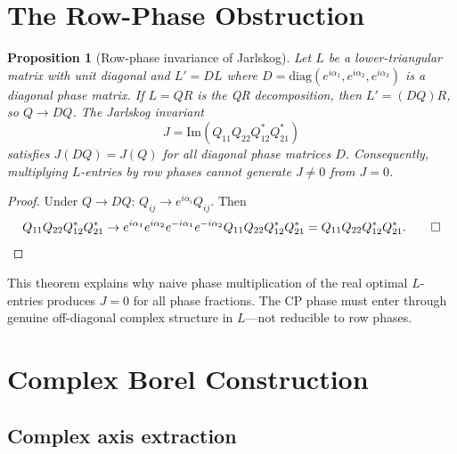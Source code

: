 \documentclass[11pt,a4paper]{article}
\newtheorem{proposition}{Proposition}
\begin{document}
\section{The Row-Phase Obstruction}
\label{sec:obstruction}

\begin{proposition}[Row-phase invariance of Jarlskog]
\label{prop:rowphase}
Let $L$ be a lower-triangular matrix with unit diagonal and
$L' = DL$ where $D = \mathrm{diag}(e^{i\alpha_1}, e^{i\alpha_2},
e^{i\alpha_3})$ is a diagonal phase matrix.  If $L = QR$ is the QR
decomposition, then $L' = (DQ)R$, so $Q \to DQ$.  The Jarlskog
invariant
\begin{equation}
  J = \mathrm{Im}(Q_{11} Q_{22} Q_{12}^* Q_{21}^*)
  \label{eq:jarlskog}
\end{equation}
satisfies $J(DQ) = J(Q)$ for all diagonal phase matrices $D$.
Consequently, multiplying $L$-entries by row phases cannot generate
$J \neq 0$ from $J = 0$.
\end{proposition}

\begin{proof}
Under $Q \to DQ$: $Q_{ij} \to e^{i\alpha_i} Q_{ij}$.  Then
\begin{equation*}
  Q_{11} Q_{22} Q_{12}^* Q_{21}^*
  \to e^{i\alpha_1} e^{i\alpha_2} e^{-i\alpha_1} e^{-i\alpha_2}
     Q_{11} Q_{22} Q_{12}^* Q_{21}^*
  = Q_{11} Q_{22} Q_{12}^* Q_{21}^*.  \qed
\end{equation*}
\end{proof}

This theorem explains why naive phase multiplication of the real
optimal $L$-entries produces $J = 0$ for all phase fractions.  The CP
phase must enter through genuine off-diagonal complex structure in
$L$---not reducible to row phases.

\section{Complex Borel Construction}
\label{sec:complex}

\subsection{Complex axis extraction}
\label{subsec:complexaxis}
\end{document}
